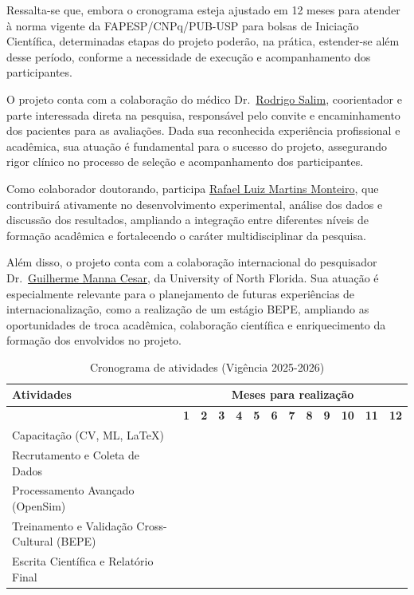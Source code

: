 \documentclass{article}
\begin{document}
Ressalta-se que, embora o cronograma esteja ajustado em 12 meses para atender à norma vigente da FAPESP/CNPq/PUB-USP para bolsas de Iniciação Científica, determinadas etapas do projeto poderão, na prática, estender-se além desse período, conforme a necessidade de execução e acompanhamento dos participantes.

O projeto conta com a colaboração do médico Dr.~\href{http://lattes.cnpq.br/3097142727488536}{Rodrigo Salim}, coorientador e parte interessada direta na pesquisa, responsável pelo convite e encaminhamento dos pacientes para as avaliações. Dada sua reconhecida experiência profissional e acadêmica, sua atuação é fundamental para o sucesso do projeto, assegurando rigor clínico no processo de seleção e acompanhamento dos participantes.

Como colaborador doutorando, participa \href{http://lattes.cnpq.br/7197039502542262}{Rafael Luiz Martins Monteiro}, que contribuirá ativamente no desenvolvimento experimental, análise dos dados e discussão dos resultados, ampliando a integração entre diferentes níveis de formação acadêmica e fortalecendo o caráter multidisciplinar da pesquisa.

Além disso, o projeto conta com a colaboração internacional do pesquisador Dr.~\href{https://webapps.unf.edu/faculty/bio/N01526872}{Guilherme Manna Cesar}, da University of North Florida. Sua atuação é especialmente relevante para o planejamento de futuras experiências de internacionalização, como a realização de um estágio BEPE, ampliando as oportunidades de troca acadêmica, colaboração científica e enriquecimento da formação dos envolvidos no projeto. \\



\begin{table}[h!]
\centering
\caption{Cronograma de atividades (Vigência 2025-2026)}
\label{tab:cronograma_destacado}
\begin{tabular}{>{\raggedright\arraybackslash}m{8cm}*{12}{c}}
\toprule
\textbf{Atividades} & \multicolumn{12}{c}{\textbf{Meses para realização}} \\
\cmidrule(lr){2-13}
& \textbf{1} & \textbf{2} & \textbf{3} & \textbf{4} & \textbf{5} & \textbf{6} & \textbf{7} & \textbf{8} & \textbf{9} & \textbf{10} & \textbf{11} & \textbf{12} \\
\midrule
Capacitação (CV, ML, \LaTeX) & \cellcolor{gray!30} & \cellcolor{gray!30} & & & & & & & & & & \\
Recrutamento e Coleta de Dados & & & \cellcolor{gray!30} & \cellcolor{gray!30} & \cellcolor{gray!30} & \cellcolor{gray!30} & & & & & & \\
Processamento Avançado (OpenSim) & & & & & & & \cellcolor{gray!30} & \cellcolor{gray!30} & & & & \\
Treinamento e Validação Cross-Cultural (BEPE) & & & & & & & & & \cellcolor{gray!30} & \cellcolor{gray!30} & \cellcolor{gray!30} & \cellcolor{gray!30} \\
Escrita Científica e Relatório Final & & & & & & & & & & & \cellcolor{gray!30} & \cellcolor{gray!30} \\
\bottomrule
\end{tabular}
\end{table}
\end{document}

